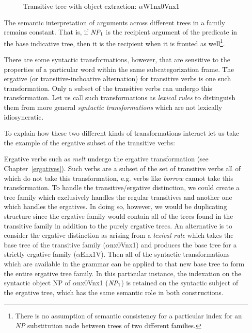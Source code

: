 \begin{figure}[htb]
\centering
\mbox{}
\caption{Transitive tree with object extraction: $\alpha$W1nx0Vnx1}
\label{trans-extracted-tree}
\end{figure} 

The semantic interpretation of arguments across different trees in a
family remains constant.  That is, if $\mbox{\em NP}_1$ is the
recipient argument of the predicate in the base indicative tree, then
it is the recipient when it is fronted as well\footnote{ There is no
assumption of semantic consistency for a particular index for an {\em
NP} substitution node between trees of two different families.}.

There are some syntactic transformations, however, that are sensitive
to the properties of a particular word within the same
subcategorization frame. The ergative (or transitive-inchoative
alternation) for transitive verbs is one such transformation. Only a
subset of the transitive verbs can undergo this transformation. Let us
call such transformations as {\em lexical rules} to distinguish them
from more general {\em syntactic transformations} which are not
lexically idiosyncratic.

To explain how these two different kinds of transformations interact
let us take the example of the ergative subset of the transitive
verbs:

Ergative verbs such as {\it melt} undergo the ergative transformation
(see Chapter~\ref{ergatives}). Such verbs are a subset of the set of
transitive verbs all of which do not take this transformation,
e.g. verbs like {\it borrow} cannot take this transformation. To
handle the transitive/ergative distinction, we could create a tree
family which exclusively handles the regular transitives and another
one which handles the ergatives.  In doing so, however, we would be
duplicating structure since the ergative family would contain all of
the trees found in the transitive family in addition to the purely
ergative trees.  An alternative is to consider the ergative
distinction as arising from a {\em lexical rule} which takes the base
tree of the transitive family ($\alpha$nx0Vnx1) and produces the base
tree for a strictly ergative family ($\alpha$Enx1V).  Then all of the
syntactic transformations which are available in the grammar can be
applied to that new base tree to form the entire ergative tree family.
In this particular instance, the indexation on the syntactic object NP
of $\alpha$nx0Vnx1 ($\mbox{\em NP}_1$) is retained on the syntactic
subject of the ergative tree, which has the same semantic role in both
constructions.


